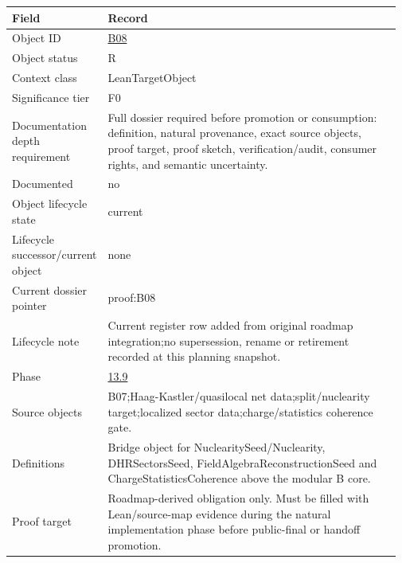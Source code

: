 \begin{longtable}{L{0.16\linewidth} L{0.81\linewidth}}
\hline
\textbf{Field} & \textbf{Record}\\
\hline
Object ID & \hyperlink{object-row-B08}{B08}\\
\hline\addlinespace[0.20em]
Object status & R\\
\hline\addlinespace[0.20em]
Context class & LeanTargetObject\\
\hline\addlinespace[0.20em]
Significance tier & F0\\
\hline\addlinespace[0.20em]
Documentation depth requirement & Full dossier required before promotion or consumption: definition, natural provenance, exact source objects, proof target, proof sketch, verification/\allowbreak{}audit, consumer rights, and semantic uncertainty.\\
\hline\addlinespace[0.20em]
Documented & no\\
\hline\addlinespace[0.20em]
Object lifecycle state & current\\
\hline\addlinespace[0.20em]
Lifecycle successor/\allowbreak{}current object & none\\
\hline\addlinespace[0.20em]
Current dossier pointer & proof:B08\\
\hline\addlinespace[0.20em]
Lifecycle note & Current register row added from original roadmap integration;\newline no supersession, rename or retirement recorded at this planning snapshot.\\
\hline\addlinespace[0.20em]
Phase & \hyperlink{phase-row-13-9}{13.9}\\
\hline\addlinespace[0.20em]
Source objects & B07;\newline Haag-Kastler/\allowbreak{}quasilocal net data;\newline split/\allowbreak{}nuclearity target;\newline localized sector data;\newline charge/\allowbreak{}statistics coherence gate.\\
\hline\addlinespace[0.20em]
Definitions & Bridge object for NuclearitySeed/\allowbreak{}Nuclearity, DHRSectorsSeed, FieldAlgebraReconstructionSeed and ChargeStatisticsCoherence above the modular B core.\\
\hline\addlinespace[0.20em]
Proof target & Roadmap-derived obligation only. Must be filled with Lean/\allowbreak{}source-map evidence during the natural implementation phase before public-final or handoff promotion.\\

\end{longtable}
